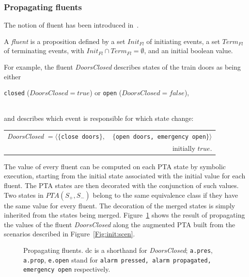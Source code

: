 \subsubsection{Propagating fluents}

The notion of fluent has been introduced in~\cite{Giannakopoulou03}.

\begin{definition}[Fluent]
A \emph{fluent} 
is a proposition defined by a set $Init_{Fl}$ of initiating events, a set $Term_{Fl}$ of 
terminating events, with $Init_{Fl}\cap Term_{Fl} = \emptyset$, and an initial boolean value.
\end{definition}

\noindent
For example, the fluent \emph{DoorsClosed} describes states of the train doors as being either \\
\centerline{\texttt{closed} ($DoorsClosed = true$) or \texttt{open} ($DoorsClosed = false$),} \\
and describes which event is responsible for which state change:

\hspace*{-.5cm}
\begin{small}
\begin{tabular}{lr}
\emph{DoorsClosed} $=\langle\{$\texttt{close doors}$\},$ &$\{$\texttt{open doors, emergency open}$\}\rangle$\\
&initially $true$.\\
\end{tabular}
\end{small}

The value of every fluent can be computed on each PTA state by symbolic execution, starting from the initial state associated with the initial value for each fluent. The PTA states are then decorated with the conjunction of such values. Two states in $PTA(S_+, S_-)$ belong to the same equivalence class if they have the same value for every fluent. The decoration of the merged states is simply inherited from the states being merged. Figure~\ref{Fig:fluents} shows the result of propagating the values of the fluent \emph{DoorsClosed} along the augmented PTA built from the scenarios described in Figure~\ref{Fig:init:scen}.

\begin{figure}[H]
\centering
{}
\caption{Propagating fluents\label{Fig:fluents}. {\small dc is a shorthand for \emph{DoorsClosed}; \texttt{a.pres}, \texttt{a.prop}, \texttt{e.open} stand for \texttt{alarm pressed, alarm propagated, emergency open} respectively}.}
\end{figure}

